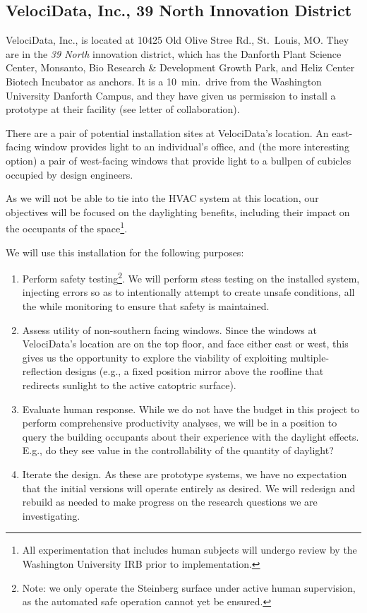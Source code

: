 \subsection{VelociData, Inc., 39 North Innovation District}

VelociData, Inc., is located at 10425 Old Olive Stree Rd., St.~Louis, MO.
They are in the \emph{39 North}
innovation district, which has the Danforth
Plant Science Center, Monsanto, Bio Research \& Development Growth Park,
and Heliz Center Biotech Incubator as anchors. It is a 10~min.~drive from
the Washington University Danforth Campus, and they have given us
permission to install a prototype at their facility (see letter
of collaboration).

There are a pair of potential installation sites at VelociData's location.
An east-facing window provides light to an individual's office, and
(the more interesting option) a pair of west-facing windows that provide
light to a bullpen of cubicles occupied by design engineers.

As we will not be able to tie into the HVAC system at this location, our
objectives will be focused on the daylighting benefits, including their
impact on the occupants of the space\footnote{All experimentation that
includes human subjects will undergo review by the Washington University
IRB prior to implementation.}.

We will use this installation for the following purposes:

\begin{enumerate}

\item Perform safety testing\footnote{Note: we only operate the Steinberg
surface under active human
supervision, as the automated safe operation cannot yet be ensured.}.
We will perform stess testing on the installed system, injecting errors so as to
intentionally attempt to create unsafe conditions, all the while monitoring
to ensure that safety is maintained.

\item Assess utility of non-southern facing windows.
Since the windows at VelociData's location are on the top floor, and face
either east or west, this gives us the opportunity to explore the viability
of exploiting multiple-reflection designs
(e.g., a fixed position mirror above the
roofline that redirects sunlight to the active catoptric surface).

\item Evaluate human response.
While we do not have the budget in this project to perform
comprehensive productivity analyses, we will be in a position to
query the building occupants about their experience with the
daylight effects. E.g., do they see value in the controllability
of the quantity of daylight?

\item Iterate the design.
As these are prototype systems, we have no expectation that the
initial versions will operate entirely as desired.  We will redesign
and rebuild as needed to make progress on the research questions we
are investigating.

\end{enumerate}

